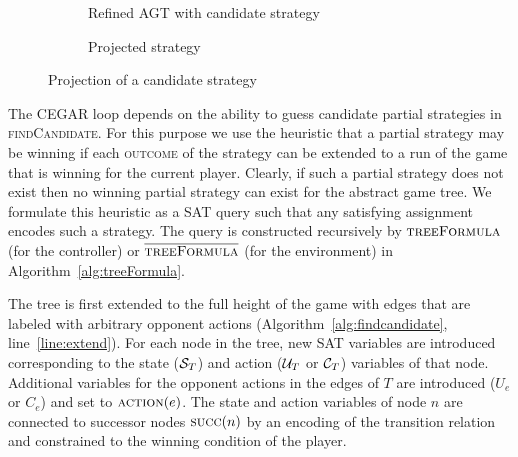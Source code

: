 \begin{figure}
\begin{subfigure}[t]{0.3\textwidth}
        \captionsetup{justification=centering}
        \caption{Refined AGT with candidate strategy}
    \end{subfigure}%
    \begin{subfigure}[t]{0.3\textwidth}
        \centering
        \begin{minipage}[t][3.9cm][t]{\textwidth}
        \centering
        \end{minipage}
        \caption{Projected strategy}
    \end{subfigure}%
    \caption{Projection of a candidate strategy}
    \label{fig:projection}
\end{figure}

The CEGAR loop depends on the ability to guess candidate partial strategies in \textsc{findCandidate}. For this purpose we use the heuristic that a partial strategy may be winning if each \textsc{outcome} of the strategy can be extended to a run of the game that is winning for the current player.  Clearly, if such a partial strategy does not exist then no winning partial strategy can exist for the abstract game tree. We formulate this heuristic as a SAT query such that any satisfying assignment encodes such a strategy. The query is constructed recursively by $\textsc{treeFormula}$ (for the controller) or $\textsc{$\overline{\mbox{treeFormula}}$}$ (for the environment) in Algorithm~\ref{alg:treeFormula}.  

The tree is first extended to the full height of the game with edges that are labeled with arbitrary opponent actions (Algorithm~\ref{alg:findcandidate}, line~\ref{line:extend}).  For each node in the tree, new SAT variables are introduced corresponding to the state ($\mathcal{S}_T$) and action ($\mathcal{U}_T$ or $\mathcal{C}_T$) variables of that node. Additional variables for the opponent actions in the edges of $T$ are introduced ($U_e$ or $C_e$) and set to $\textsc{action}(e)$.  The state and action variables of node $n$ are connected to successor nodes $\textsc{succ}(n)$ by an encoding of the transition relation and constrained to the winning condition of the player.  

